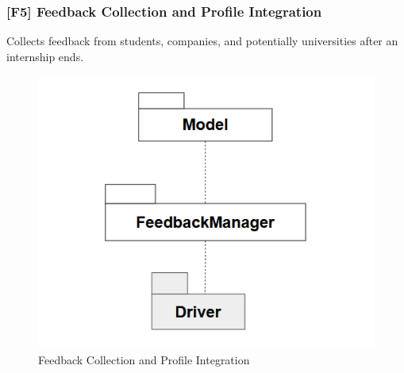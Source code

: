 \subsubsection*{[F5] Feedback Collection and Profile Integration}
Collects feedback from students, companies, and potentially universities after an internship ends.

\begin{figure}[h]
    \centering
    \includegraphics[width=0.5\linewidth]{DD-Latex//assets//Component Integration Graphs/component5.png}
    \caption{Feedback Collection and Profile Integration}
\end{figure}
